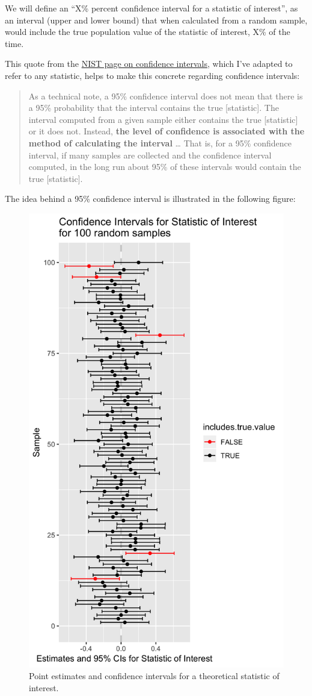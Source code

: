 \documentclass[]{book}
\theoremstyle{definition}
\theoremstyle{definition}
\theoremstyle{definition}
\theoremstyle{remark}
\begin{document}
We will define an ``X\% percent confidence interval for a statistic of
interest'', as an interval (upper and lower bound) that when calculated
from a random sample, would include the true population value of the
statistic of interest, X\% of the time.

This quote from the
\href{http://www.itl.nist.gov/div898/handbook/eda/section3/eda352.htm}{NIST
page on confidence intervals}, which I've adapted to refer to any
statistic, helps to make this concrete regarding confidence intervals:

\begin{quote}
As a technical note, a 95\% confidence interval does not mean that there
is a 95\% probability that the interval contains the true
{[}statistic{]}. The interval computed from a given sample either
contains the true {[}statistic{]} or it does not. Instead, \textbf{the
level of confidence is associated with the method of calculating the
interval} \ldots{} That is, for a 95\% confidence interval, if many
samples are collected and the confidence interval computed, in the long
run about 95\% of these intervals would contain the true
{[}statistic{]}.
\end{quote}

The idea behind a 95\% confidence interval is illustrated in the
following figure:

\begin{figure}

{\centering \includegraphics[width=0.6\linewidth]{./figures/fig-CIs} 

}

\caption{Point estimates and confidence intervals for a theoretical statistic of interest.}\label{fig:unnamed-chunk-409}
\end{figure}
\end{document}

